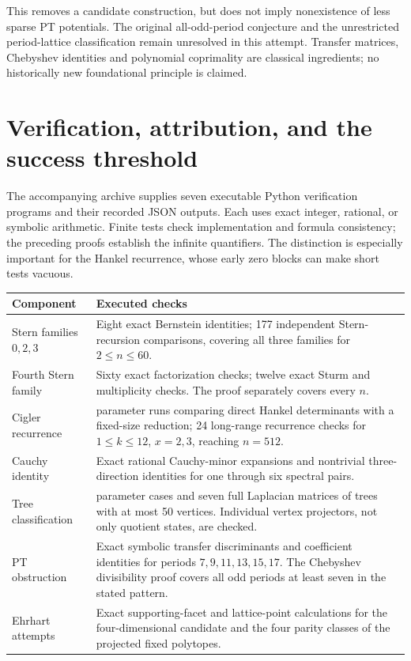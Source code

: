 \documentclass[11pt,a4paper]{article}
\theoremstyle{definition}\newtheorem{definition}[theorem]{Definition}
\theoremstyle{remark}\newtheorem{remark}[theorem]{Remark}
\begin{document}
This removes a candidate construction, but does not imply nonexistence
of less sparse PT potentials. The original all-odd-period conjecture and
the unrestricted period-lattice classification remain unresolved in this
attempt. Transfer matrices, Chebyshev identities and polynomial
coprimality are classical ingredients; no historically new foundational
principle is claimed.

\section{Verification, attribution, and the success threshold}

The accompanying archive supplies seven executable Python verification
programs and their recorded JSON outputs. Each uses exact integer,
rational, or symbolic arithmetic. Finite tests check implementation and
formula consistency; the preceding proofs establish the infinite
quantifiers. The distinction is especially important for the Hankel
recurrence, whose early zero blocks can make short tests vacuous.

\begin{center}\small
\begin{tabular}{@{}>{\raggedright\arraybackslash}p{}>{\raggedright\arraybackslash}p{}@{}}
\toprule
Component & Executed checks \\
\midrule
Stern families $0,2,3$ & Eight exact Bernstein identities; 177 independent Stern-recursion comparisons, covering all three families for $2\leq n\leq60$. \\
Fourth Stern family & Sixty exact factorization checks; twelve exact Sturm and multiplicity checks. The proof separately covers every $n$. \\
Cigler recurrence & 108 parameter runs comparing direct Hankel determinants with a fixed-size reduction; 24 long-range recurrence checks for $1\leq k\leq12$, $x=2,3$, reaching $n=512$. \\
Cauchy identity & Exact rational Cauchy-minor expansions and nontrivial three-direction identities for one through six spectral pairs. \\
Tree classification & 870 parameter cases and seven full Laplacian matrices of trees with at most 50 vertices. Individual vertex projectors, not only quotient states, are checked. \\
PT obstruction & Exact symbolic transfer discriminants and coefficient identities for periods $7,9,11,13,15,17$. The Chebyshev divisibility proof covers all odd periods at least seven in the stated pattern. \\
Ehrhart attempts & Exact supporting-facet and lattice-point calculations for the four-dimensional candidate and the four parity classes of the projected fixed polytopes. \\
\bottomrule
\end{tabular}
\end{center}
\end{document}
